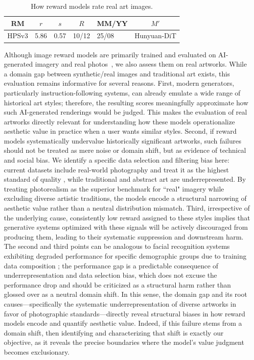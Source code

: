 \label{sec:real}
\begin{table}[]
    \centering
    \small
    \begin{tabular}{c|ccclc}
    \toprule
      RM & $r$ & $s$ & $R$ &  MM/YY &$M'$ \\ \midrule
 HPSv3& 5.86& 0.57& 10/12&  25/08&Hunyuan-DiT\\
 \bottomrule
    \end{tabular}
    \caption{How reward models rate real art images.}
    \label{tab:real_arts}
\end{table}

Although image reward models are primarily trained and evaluated on AI-generated imagery and real photos~\mbox{\cite{ma_hpsv3_2025}}, we also assess them on real artworks. While a domain gap between synthetic/real images and traditional art exists, this evaluation remains informative for several reasons. First, modern generators, particularly instruction-following systems, can already emulate a wide range of historical art styles; therefore, the resulting scores meaningfully approximate how such AI-generated renderings would be judged. This makes the evaluation of real artworks directly relevant for understanding how these models operationalize aesthetic value in practice when a user wants similar styles. Second, if reward models systematically undervalue historically significant artworks, such failures should not be treated as mere noise or domain shift, but as evidence of technical and social bias. We identify a specific data selection and filtering bias here: current datasets include real-world photography and treat it as the highest standard of quality \cite{ma_hpsv3_2025}, while traditional and abstract art are underrepresented. By treating photorealism as the superior benchmark for ``real" imagery while excluding diverse artistic traditions, the models encode a structural narrowing of aesthetic value rather than a neutral distribution mismatch. Third, irrespective of the underlying cause, consistently low reward assigned to these styles implies that generative systems optimized with these signals will be actively discouraged from producing them, leading to their systematic suppression and downstream harm. The second and third points can be analogous to facial recognition systems exhibiting degraded performance for specific demographic groups due to training data composition \cite{buolamwini_gender_2018}; the performance gap is a predictable consequence of underrepresentation and data selection bias, which does not excuse the performance drop and should be criticized as a structural harm rather than glossed over as a neutral domain shift. In this sense, the domain gap and its root causes—specifically the systematic underrepresentation of diverse artworks in favor of photographic standards—directly reveal structural biases in how reward models encode and quantify aesthetic value. Indeed, if this failure stems from a domain shift, then identifying and characterizing that shift is exactly our objective, as it reveals the precise boundaries where the model’s value judgment becomes exclusionary.

